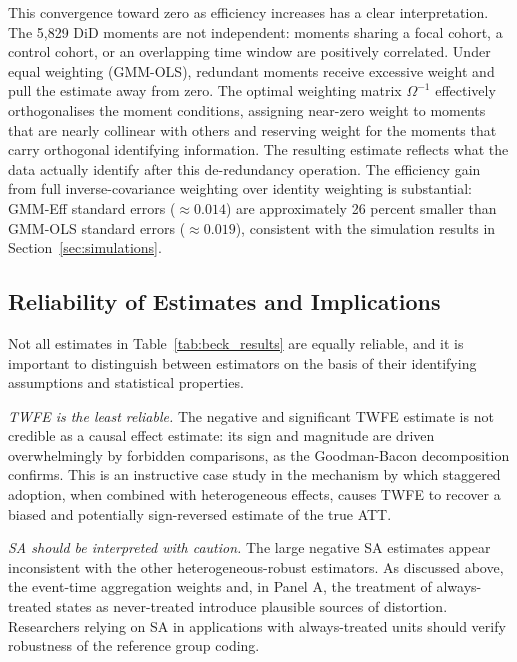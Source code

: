 This convergence toward zero as efficiency increases has a clear
interpretation. The 5{,}829 DiD moments are not independent: moments
sharing a focal cohort, a control cohort, or an overlapping time
window are positively correlated. Under equal weighting (GMM-OLS),
redundant moments receive excessive weight and pull the estimate away
from zero. The optimal weighting matrix $\Omega^{-1}$ effectively
orthogonalises the moment conditions, assigning near-zero weight to
moments that are nearly collinear with others and reserving
weight for the moments that carry orthogonal identifying information.
The resulting estimate reflects what the data actually identify after
this de-redundancy operation. The efficiency gain from full
inverse-covariance weighting over identity weighting is substantial:
GMM-Eff standard errors ($\approx 0.014$) are approximately 26 percent
smaller than GMM-OLS standard errors ($\approx 0.019$), consistent
with the simulation results in Section~\ref{sec:simulations}.

\subsection{Reliability of Estimates and Implications}
\label{subsec:reliability}

Not all estimates in Table~\ref{tab:beck_results} are equally reliable,
and it is important to distinguish between estimators on the basis of
their identifying assumptions and statistical properties.

\textit{TWFE is the least reliable.} The negative and significant TWFE
estimate is not credible as a causal effect estimate: its sign and
magnitude are driven overwhelmingly by forbidden comparisons, as the
Goodman-Bacon decomposition confirms. This is an instructive case study
in the mechanism by which staggered adoption, when combined with
heterogeneous effects, causes TWFE to recover a biased and potentially
sign-reversed estimate of the true ATT.

\textit{SA should be interpreted with caution.} The large negative SA
estimates appear inconsistent with the other heterogeneous-robust
estimators. As discussed above, the event-time aggregation weights
and, in Panel A, the treatment of always-treated states as
never-treated introduce plausible sources of distortion. Researchers
relying on SA in applications with always-treated units should verify
robustness of the reference group coding.

